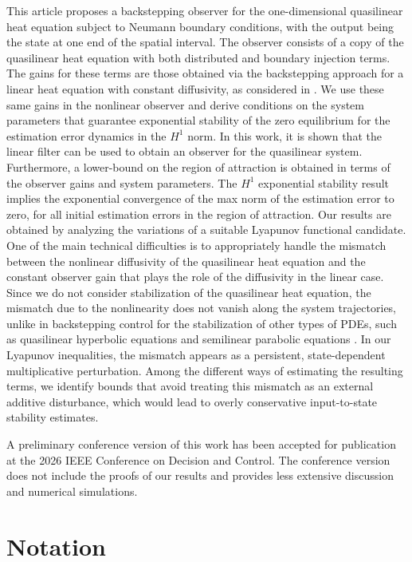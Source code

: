 \documentclass[twocolumn]{autart}
\begin{document}
This article proposes a backstepping observer for the one-dimensional quasilinear heat equation subject to Neumann boundary conditions, with the output being the state at one end of the spatial interval. The observer consists of a copy of the quasilinear heat equation with both distributed and boundary injection terms. The gains for these terms are those obtained via the backstepping approach for a linear heat equation with constant diffusivity, as considered in \cite{back_linear}. We use these same gains in the nonlinear observer and derive conditions on the system parameters that guarantee exponential stability of the zero equilibrium for the estimation error dynamics in the $H^1$ norm. In this work, it is shown that the linear filter can be used to obtain an observer for the quasilinear system. Furthermore, a lower-bound on the region of attraction is obtained in terms of the observer gains and system parameters. The $H^1$ exponential stability result implies the exponential convergence of the max norm of the estimation error to zero, for all initial estimation errors in the region of attraction. Our results are obtained by analyzing the variations of a suitable Lyapunov functional candidate. One of the main technical difficulties is to appropriately handle the mismatch between the nonlinear diffusivity of the quasilinear heat equation and the constant observer gain that plays the role of the diffusivity in the linear case. Since we do not consider stabilization of the quasilinear heat equation, the mismatch due to the nonlinearity does not vanish along the system trajectories, unlike in backstepping control for the stabilization of other types of PDEs, such as quasilinear hyperbolic equations \cite{coron} and semilinear parabolic equations \cite{semi}. In our Lyapunov inequalities, the mismatch appears as a persistent, state-dependent multiplicative perturbation. Among the different ways of estimating the resulting terms, we identify bounds that avoid treating this mismatch as an external additive disturbance, which would lead to overly conservative input-to-state stability estimates.

A preliminary conference version of this work has been accepted for publication at the 2026 IEEE Conference on Decision and Control. The conference version does not include the proofs of our results and provides less extensive discussion and numerical simulations.


\section{Notation}
\end{document}

